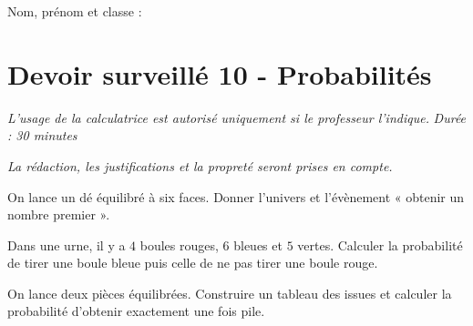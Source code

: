 \documentclass[a4paper,10pt]{report}
\begin{document}
\pagestyle{empty}
\noindent Nom, prénom et classe : \dotfill

\section*{Devoir surveillé 10 - Probabilités}

\noindent \textit{L'usage de la calculatrice est autorisé uniquement si le professeur l'indique.} \hfill \textit{Durée : 30 minutes}

\medskip
\noindent \textit{La rédaction, les justifications et la propreté seront prises en compte.}


\begin{ex}[Univers]
On lance un dé équilibré à six faces. Donner l'univers et l'évènement « obtenir un nombre premier ».
\medskip\noindent\grandscarreaux{\linewidth}{2.5cm}
\end{ex}
\begin{ex}[Calcul]
Dans une urne, il y a $4$ boules rouges, $6$ bleues et $5$ vertes. Calculer la probabilité de tirer une boule bleue puis celle de ne pas tirer une boule rouge.
\medskip\noindent\grandscarreaux{\linewidth}{4cm}
\end{ex}
\begin{ex}
On lance deux pièces équilibrées. Construire un tableau des issues et calculer la probabilité d'obtenir exactement une fois pile.
\medskip\noindent\grandscarreaux{\linewidth}{5cm}
\end{ex}
\end{document}
